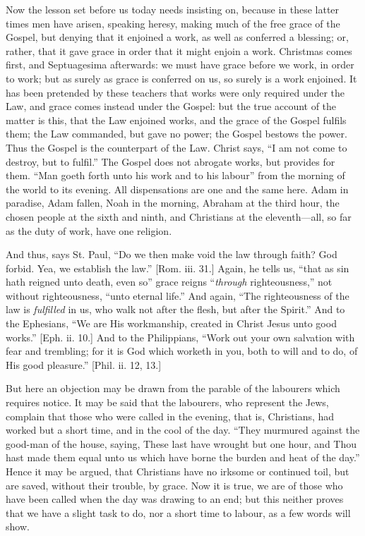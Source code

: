 Now the lesson set before us today needs insisting on, because in
these latter times men have arisen, speaking heresy, making much of
the free grace of the Gospel, but denying that it enjoined a work, as
well as conferred a blessing; or, rather, that it gave grace in order
that it might enjoin a work. Christmas comes first, and Septuagesima
afterwards: we must have grace before we work, in order to work; but
as surely as grace is conferred on us, so surely is a work enjoined.
It has been pretended by these teachers that works were only required
under the Law, and grace comes instead under the Gospel: but the true
account of the matter is this, that the Law enjoined works, and the
grace of the Gospel fulfils them; the Law commanded, but gave no
power; the Gospel bestows the power. Thus the Gospel is the
counterpart of the Law. Christ says, ``I am not come to destroy,
but to fulfil.'' The Gospel does not abrogate works, but provides
for them. ``Man goeth forth unto his work and to his labour''
from the morning of the world to its evening. All dispensations are
one and the same here. Adam in paradise, Adam fallen, Noah in the
morning, Abraham at the third hour, the chosen people at the sixth and
ninth, and Christians at the eleventh—all, so far as the duty of
work, have one religion.

And thus, says St. Paul, ``Do we then make void the law through
faith? God forbid. Yea, we establish the law.'' [Rom. iii. 31.]
Again, he tells us, ``that as sin hath reigned unto death, even
so'' grace reigns ``\emph{through} righteousness,'' not
without righteousness, ``unto eternal life.'' And again,
``The righteousness of the law is \emph{fulfilled} in us, who walk
not after the flesh, but after the Spirit.'' And to the Ephesians,
``We are His workmanship, created in Christ Jesus unto good
works.'' [Eph. ii. 10.] And to the Philippians, ``Work out
your own salvation with fear and trembling; for it is God which
worketh in you, both to will and to do, of His good pleasure.''
[Phil. ii. 12, 13.]

But here an objection may be drawn from the parable of the
labourers which requires notice. It may be said that the labourers,
who represent the Jews, complain that those who were called in the
evening, that is, Christians, had worked but a short time, and in the
cool of the day. ``They murmured against the good-man of the
house, saying, These last have wrought but one hour, and Thou hast
made them equal unto us which have borne the burden and heat of the
day.'' Hence it may be argued, that Christians have no irksome or
continued toil, but are saved, without their trouble, by grace. Now it
is true, we are of those who have been called when the day was drawing
to an end; but this neither proves that we have a slight task to do,
nor a short time to labour, as a few words will show.

